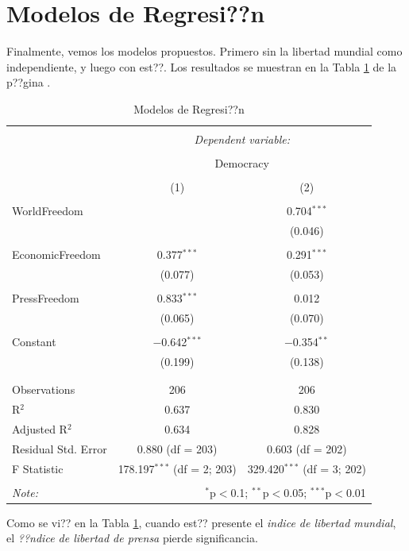 \documentclass{article}
\begin{document}
\clearpage

\section{Modelos de Regresi??n}

Finalmente, vemos los modelos propuestos. Primero sin la libertad mundial como independiente, y luego con est??. Los resultados se muestran en la Tabla \ref{regresiones} de la p??gina \pageref{regresiones}.



\begin{table}[!htbp] \centering 
  \caption{Modelos de Regresi??n} 
  \label{regresiones} 
\begin{tabular}{@{\extracolsep{5pt}}lcc} 
\\[-1.8ex]\hline 
\hline \\[-1.8ex] 
 & \multicolumn{2}{c}{\textit{Dependent variable:}} \\ 
\cline{2-3} 
\\[-1.8ex] & \multicolumn{2}{c}{Democracy} \\ 
\\[-1.8ex] & (1) & (2)\\ 
\hline \\[-1.8ex] 
 WorldFreedom &  & 0.704$^{***}$ \\ 
  &  & (0.046) \\ 
  & & \\ 
 EconomicFreedom & 0.377$^{***}$ & 0.291$^{***}$ \\ 
  & (0.077) & (0.053) \\ 
  & & \\ 
 PressFreedom & 0.833$^{***}$ & 0.012 \\ 
  & (0.065) & (0.070) \\ 
  & & \\ 
 Constant & $-$0.642$^{***}$ & $-$0.354$^{**}$ \\ 
  & (0.199) & (0.138) \\ 
  & & \\ 
\hline \\[-1.8ex] 
Observations & 206 & 206 \\ 
R$^{2}$ & 0.637 & 0.830 \\ 
Adjusted R$^{2}$ & 0.634 & 0.828 \\ 
Residual Std. Error & 0.880 (df = 203) & 0.603 (df = 202) \\ 
F Statistic & 178.197$^{***}$ (df = 2; 203) & 329.420$^{***}$ (df = 3; 202) \\ 
\hline 
\hline \\[-1.8ex] 
\textit{Note:}  & \multicolumn{2}{r}{$^{*}$p$<$0.1; $^{**}$p$<$0.05; $^{***}$p$<$0.01} \\ 
\end{tabular} 
\end{table} 
Como se vi?? en la Tabla \ref{regresiones}, cuando est?? presente el \emph{indice de libertad mundial}, el \emph{??ndice de libertad de prensa} pierde significancia.
\end{document}
